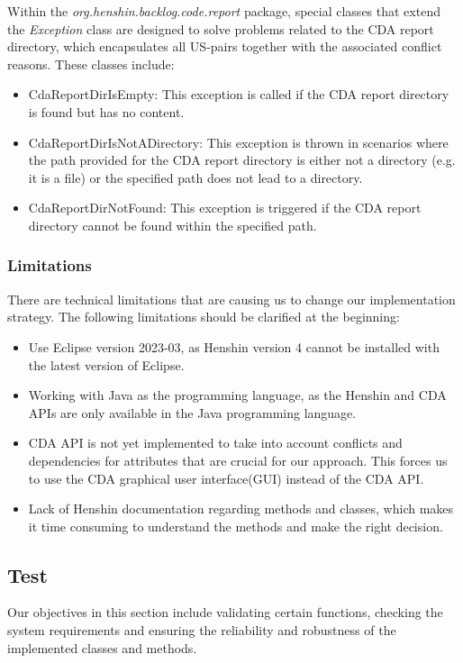 Within the \textit{org.henshin.backlog.code.report} package, special classes that extend the \textit{Exception} class are designed to solve problems related to the CDA report directory, which encapsulates all US-pairs together with the associated conflict reasons. These classes include:
\begin{itemize}
	\item CdaReportDirIsEmpty: This exception is called if the CDA report directory is found but has no content.
	\item CdaReportDirIsNotADirectory: This exception is thrown in scenarios where the path provided for the CDA report directory is either not a directory (e.g. it is a file) or the specified path does not lead to a directory.
	\item CdaReportDirNotFound: This exception is triggered if the CDA report directory cannot be found within the specified path.
\end{itemize}
\subsubsection*{Limitations}
There are technical limitations that are causing us to change our implementation strategy.
The following limitations should be clarified at the beginning:
\begin{itemize}
	\item Use Eclipse version 2023-03, as Henshin version 4 cannot be installed with the latest version of Eclipse.
	
	\item Working with Java as the programming language, as the Henshin and CDA APIs are only available in the Java programming language.
	
	\item CDA API is not yet implemented to take into account conflicts and dependencies for attributes that are crucial for our approach. This forces us to use the CDA graphical user interface(GUI) instead of the CDA API.
	
	\item Lack of Henshin documentation regarding methods and classes, which makes it time consuming to understand the methods and make the right decision.
\end{itemize}
\subsection{Test}\label{redundancy_test}
Our objectives in this section include validating certain functions, checking the system requirements and ensuring the reliability and robustness of the implemented classes and methods.

